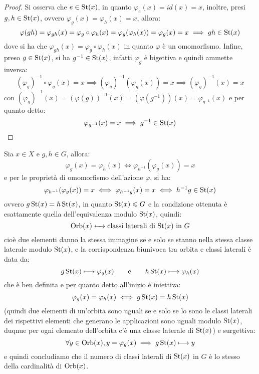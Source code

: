 \documentclass[11pt]{scrartcl}
\begin{document}
\begin{proof}
    Si osserva che $e \in \operatorname{St}(x)$, in quanto $\varphi_e(x) = id(x) = x$, inoltre, presi $g,h \in \operatorname{St}(x)$, ovvero $\varphi_g (x) = \varphi_h(x) = x$, allora:
        \[ \varphi(gh) = \varphi_{gh}(x) = \varphi_g \circ \varphi_h (x) = \varphi_g(\varphi_h(x)) = \varphi_g(x) = x \implies gh \in \operatorname{St}(x)
            \]
    dove si ha che $ \varphi_{gh}(x) = \varphi_g \circ \varphi_h (x)$ in quanto $\varphi$ è un omomorfismo.
    Infine, preso $g \in \operatorname{St}(x)$, si ha $g^{-1} \in \operatorname{St}(x)$, infatti $\varphi_g$ è bigettiva e quindi ammette inversa:
        \[ (\varphi_g)^{-1} \circ \varphi_g (x) = x \implies (\varphi_g)^{-1}(\varphi_g(x)) = x \implies (\varphi_g)^{-1}(x) = x
            \]
    con $(\varphi_g)^{-1}(x) = (\varphi(g))^{-1}(x) = (\varphi(g^{-1}))(x) = \varphi_{g^{-1}}(x)$ e per quanto detto:
        \[ \varphi_{g^{-1}} (x) = x \implies g^{-1} \in \operatorname{St}(x)
            \]
\end{proof}

\pagebreak
\begin{remark}
    Sia $x \in X$ e $g,h \in G$, allora:
        \[ \varphi_g(x) = \varphi_h(x) \iff \varphi_{h^{-1}}(\varphi_g(x)) = x
            \]
    e per le proprietà di omomorfismo dell'azione $\varphi$, si ha:
        \[ \varphi_{h^{-1}}(\varphi_g(x)) = x \iff \varphi_{h^{-1}g}(x) = x \iff h^{-1}g \in \operatorname{St}(x)
            \]
    ovvero $g \operatorname{St}(x) = h \operatorname{St}(x)$, in quanto $\operatorname{St}(x) \leqslant G$ e la condizione ottenuta è esattamente quella dell'equivalenza modulo $\operatorname{St}(x)$,
    quindi:
    \[ \operatorname{Orb}(x) \leftarrow\mathrel{\mkern-7mu}\rightarrow \text{classi laterali di $\operatorname{St}(x)$ in $G$}
        \]
    cioè due elementi danno la stessa immagine se e solo se stanno nella stessa classe laterale modulo $\operatorname{St}(x)$, e la corrispondenza biunivoca tra orbita e classi
    laterali è data da:
    \[ g\operatorname{St}(x) \longmapsto \varphi_g(x) \qquad \text e \qquad h\operatorname{St}(x) \longmapsto \varphi_h(x)
                \]
    che è ben definita e per quanto detto all'inizio è iniettiva:
        \[ \varphi_g(x) = \varphi_h(x) \iff g\operatorname{St}(x) = h\operatorname{St}(x)
            \]
    (quindi due elementi di un'orbita sono uguali se e solo se lo sono le classi laterali dei rispettivi elementi che generano le applicazioni sono uguali modulo $\operatorname{St}(x)$, duqnue per ogni elemento
    dell'orbita c'è una classe laterale di $\operatorname{St}(x)$) e surgettiva:
        \[ \forall y \in \operatorname{Orb}(x), y = \varphi_g(x) \implies g\operatorname{St}(x) \longmapsto y
            \]
    e quindi concludiamo che il numero di classi laterali di $\operatorname{St}(x)$ in $G$ è lo stesso della cardinalità di $\operatorname{Orb}(x)$.
\end{remark}
\end{document}
